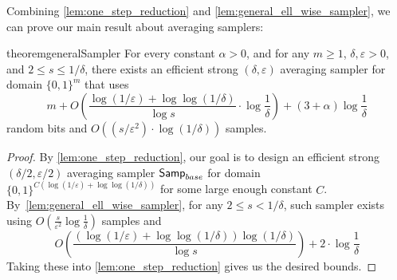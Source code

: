 \documentclass[10pt,a4paper]{article}
\newcommand{\eps}{\varepsilon}
\newcommand{\1}{\mathbbm{1}}
\newcommand{\tuple}[1]{\left(#1\right)}
\newcommand{\zo}{\{0, 1\}}
\newcommand{\Smp}{\textup{\textsf{Samp}}}
\begin{document}





Combining \cref{lem:one_step_reduction} and \cref{lem:general_ell_wise_sampler}, we can prove our main result about averaging samplers:


\begin{restatable}{theorem}{generalSampler}
    \label{thm:general_sampler}
     For every constant $\alpha > 0$, and for any $m \ge 1$, $\delta, \eps > 0$, and  $2 \le s \le 1 / \delta$, there exists an efficient strong $(\delta, \eps)$ averaging sampler for domain $\zo^m$  that uses
    \[m + O\tuple{\frac{\log(1/\eps) + \log\log(1 / \delta)}{\log s} \cdot \log \frac{1}{\delta} } + (3 + \alpha) \log \frac{1}{\delta}\] random bits and $O( (s / \eps^2) \cdot \log (1 / \delta))$ samples.  
\end{restatable}



\begin{proof}
 By \cref{lem:one_step_reduction}, our goal is to design an efficient strong $(\delta / 2, \eps / 2)$ averaging sampler $\Smp_{base}$ for domain $\zo^{C(\log(1 / \eps) + \log\log (1 / \delta))}$ for some large enough constant $C$. By~\cref{lem:general_ell_wise_sampler}, for any $2 \le s < 1 / \delta$, such sampler exists using $O(\frac{s}{\eps^{2}}\log \frac{1}{\delta})$ samples and   
 \[
 O\tuple{\frac{(\log (1 / \eps) + \log\log(1 / \delta))\log(1 / \delta)}{\log s}} + 2 \cdot {\log \frac{1}{\delta}}
 \]
 Taking these into \cref{lem:one_step_reduction} gives us the desired bounds.
\end{proof}
\end{document}
